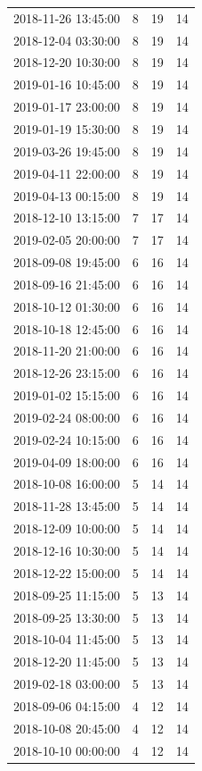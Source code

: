 \begin{tabular}{lrrr}
2018-11-26 13:45:00 & 8 & 19 & 14 \\
2018-12-04 03:30:00 & 8 & 19 & 14 \\
2018-12-20 10:30:00 & 8 & 19 & 14 \\
2019-01-16 10:45:00 & 8 & 19 & 14 \\
2019-01-17 23:00:00 & 8 & 19 & 14 \\
2019-01-19 15:30:00 & 8 & 19 & 14 \\
2019-03-26 19:45:00 & 8 & 19 & 14 \\
2019-04-11 22:00:00 & 8 & 19 & 14 \\
2019-04-13 00:15:00 & 8 & 19 & 14 \\
2018-12-10 13:15:00 & 7 & 17 & 14 \\
2019-02-05 20:00:00 & 7 & 17 & 14 \\
2018-09-08 19:45:00 & 6 & 16 & 14 \\
2018-09-16 21:45:00 & 6 & 16 & 14 \\
2018-10-12 01:30:00 & 6 & 16 & 14 \\
2018-10-18 12:45:00 & 6 & 16 & 14 \\
2018-11-20 21:00:00 & 6 & 16 & 14 \\
2018-12-26 23:15:00 & 6 & 16 & 14 \\
2019-01-02 15:15:00 & 6 & 16 & 14 \\
2019-02-24 08:00:00 & 6 & 16 & 14 \\
2019-02-24 10:15:00 & 6 & 16 & 14 \\
2019-04-09 18:00:00 & 6 & 16 & 14 \\
2018-10-08 16:00:00 & 5 & 14 & 14 \\
2018-11-28 13:45:00 & 5 & 14 & 14 \\
2018-12-09 10:00:00 & 5 & 14 & 14 \\
2018-12-16 10:30:00 & 5 & 14 & 14 \\
2018-12-22 15:00:00 & 5 & 14 & 14 \\
2018-09-25 11:15:00 & 5 & 13 & 14 \\
2018-09-25 13:30:00 & 5 & 13 & 14 \\
2018-10-04 11:45:00 & 5 & 13 & 14 \\
2018-12-20 11:45:00 & 5 & 13 & 14 \\
2019-02-18 03:00:00 & 5 & 13 & 14 \\
2018-09-06 04:15:00 & 4 & 12 & 14 \\
2018-10-08 20:45:00 & 4 & 12 & 14 \\
2018-10-10 00:00:00 & 4 & 12 & 14 \\

\end{tabular}
